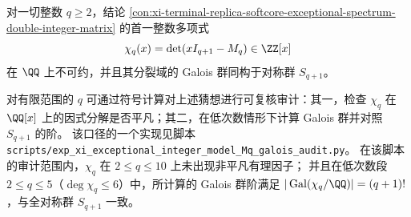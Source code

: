 \begin{conjecture}\label{conj:xi-exceptional-charpoly-full-symmetric-galois}
对一切整数 \(q\ge 2\)，结论 \ref{con:xi-terminal-replica-softcore-exceptional-spectrum-double-integer-matrix} 的首一整数多项式
\[
\chi_q(x)=\det(xI_{q+1}-M_q)\in\ZZ[x]
\]
在 \(\QQ\) 上不可约，并且其分裂域的 Galois 群同构于对称群 \(S_{q+1}\)。
\end{conjecture}

\begin{remark}[有限阶审计口径]\label{rem:xi-exceptional-charpoly-galois-audit-scope}
对有限范围的 \(q\) 可通过符号计算对上述猜想进行可复核审计：其一，检查 \(\chi_q\) 在 \(\QQ[x]\) 上的因式分解是否平凡；其二，在低次数情形下计算 Galois 群并对照 \(S_{q+1}\) 的阶。
该口径的一个实现见脚本 \texttt{scripts/exp\_xi\_exceptional\_integer\_model\_Mq\_galois\_audit.py}。
在该脚本的审计范围内，\(\chi_q\) 在 \(2\le q\le 10\) 上未出现非平凡有理因子；
并且在低次数段 \(2\le q\le 5\)（\(\deg \chi_q\le 6\)）中，所计算的 Galois 群阶满足 \(|\operatorname{Gal}(\chi_q/\QQ)|=(q+1)!\)，与全对称群 \(S_{q+1}\) 一致。
\end{remark}

\endinput

